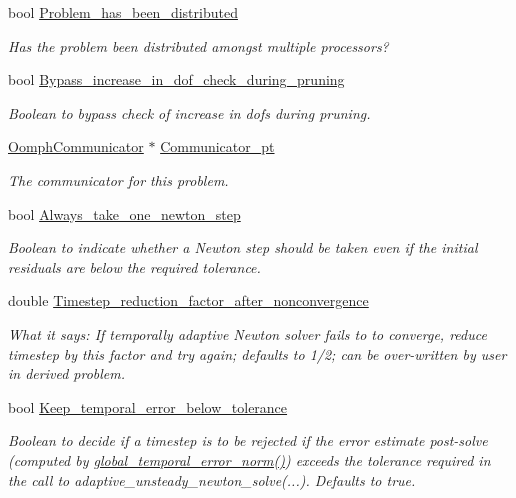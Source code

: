\begin{DoxyCompactItemize}
bool \hyperlink{classoomph_1_1Problem_a5c6bd262be3544343a30767da278d846}{Problem\+\_\+has\+\_\+been\+\_\+distributed}
\begin{DoxyCompactList}\small\item\em Has the problem been distributed amongst multiple processors? \end{DoxyCompactList}\item 
bool \hyperlink{classoomph_1_1Problem_a2cee2eaaf1ac49020fc76b3b6adb9bba}{Bypass\+\_\+increase\+\_\+in\+\_\+dof\+\_\+check\+\_\+during\+\_\+pruning}
\begin{DoxyCompactList}\small\item\em Boolean to bypass check of increase in dofs during pruning. \end{DoxyCompactList}\item 
\hyperlink{classoomph_1_1OomphCommunicator}{Oomph\+Communicator} $\ast$ \hyperlink{classoomph_1_1Problem_a937afdd0d5a039943482f8be9b24c82e}{Communicator\+\_\+pt}
\begin{DoxyCompactList}\small\item\em The communicator for this problem. \end{DoxyCompactList}\item 
bool \hyperlink{classoomph_1_1Problem_a01d7376ab9cc06e4d5619b34fd39dee2}{Always\+\_\+take\+\_\+one\+\_\+newton\+\_\+step}
\begin{DoxyCompactList}\small\item\em Boolean to indicate whether a Newton step should be taken even if the initial residuals are below the required tolerance. \end{DoxyCompactList}\item 
double \hyperlink{classoomph_1_1Problem_a359d1936bc2146e0a0ce697776efcf91}{Timestep\+\_\+reduction\+\_\+factor\+\_\+after\+\_\+nonconvergence}
\begin{DoxyCompactList}\small\item\em What it says\+: If temporally adaptive Newton solver fails to to converge, reduce timestep by this factor and try again; defaults to 1/2; can be over-\/written by user in derived problem. \end{DoxyCompactList}\item 
bool \hyperlink{classoomph_1_1Problem_ab27af4a444de9f59125ee50ac778d97a}{Keep\+\_\+temporal\+\_\+error\+\_\+below\+\_\+tolerance}
\begin{DoxyCompactList}\small\item\em Boolean to decide if a timestep is to be rejected if the error estimate post-\/solve (computed by \hyperlink{classoomph_1_1Problem_ac7667864b71a3889c95c29307422ac8e}{global\+\_\+temporal\+\_\+error\+\_\+norm()}) exceeds the tolerance required in the call to adaptive\+\_\+unsteady\+\_\+newton\+\_\+solve(...). Defaults to true. \end{DoxyCompactList}\end{DoxyCompactItemize}
